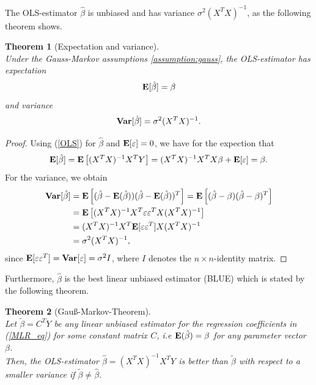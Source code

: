 \documentclass[a4paper, 12pt]{scrreprt}
\newtheorem{Theorem}{Theorem}[chapter]
\newcommand{\ew}{\mbox{\textbf{E}}}
\newcommand{\var}{\mbox{\textbf{Var}}}
\begin{document}
The OLS-estimator $\hat{\beta}$ is unbiased and has variance $\sigma^2 (X^T X)^{-1}$, as the following theorem shows.

\begin{Theorem}[Expectation and variance] \upshape $\text{ }$ \\
Under the Gauss-Markov assumptions \ref{assumption:gauss}, the OLS-estimator has expectation
\begin{equation}\label{OLS:unbiased}
\ew[\hat{\beta}] = \beta
\end{equation}
and variance
\begin{equation}\label{OLS:variance}
\var[\hat{\beta}] = \sigma^2 (X^T X)^{-1}.
\end{equation}
\end{Theorem}
\begin{proof}
Using (\ref{OLS}) for $\hat{\beta}$ and $\ew[\varepsilon]=0$, we have for the expection that
\begin{equation*}
\ew[\hat{\beta}] = \ew \left[(X^T X)^{-1} X^T Y \right] = (X^T X)^{-1} X^T X \beta + \ew[\varepsilon] = \beta.
\end{equation*}
For the variance, we obtain
\begin{align*}
\var[\hat{\beta}] &= \ew \left[ (\hat{\beta} - \ew(\hat{\beta}))(\hat{\beta} - \ew(\hat{\beta}))^T \right] = \ew \left[ (\hat{\beta} - \beta)(\hat{\beta} - \beta)^T \right]  \\
&= \ew \left[ (X^T X)^{-1} X^T \varepsilon \varepsilon^T X (X^T X) ^{-1} \right]  \\
&= (X^T X)^{-1} X^T \ew[\varepsilon \varepsilon^T] X (X^T X) ^{-1}   \\
&= \sigma^2 (X^T X)^{-1},
\end{align*}
since $\ew[\varepsilon \varepsilon^T] = \var[\varepsilon] = \sigma^2 I$, where $I$ denotes the $n \times n$-identity matrix.
\end{proof}
Furthermore, $\hat{\beta}$ is the best linear unbiased estimator (BLUE) which is stated by the following theorem.

\begin{Theorem}[Gauß-Markov-Theorem] \label{gaussmarkov} $\text{ }$ \\ \upshape
Let $\tilde{\beta} = C^T Y$ be any linear unbiased estimator for the regression coefficients in (\ref{MLR_eq}) for some constant matrix $C$, i.e $\ew(\tilde{\beta}) = \beta$ for any parameter vector $\beta$. \\
Then, the OLS-estimator $\hat{\beta} = (X^T X)^{-1} X^T Y$ is better than $\tilde{\beta}$ with respect to a smaller variance if $\tilde{\beta} \neq \hat{\beta}$.
\end{Theorem}
\end{document}
